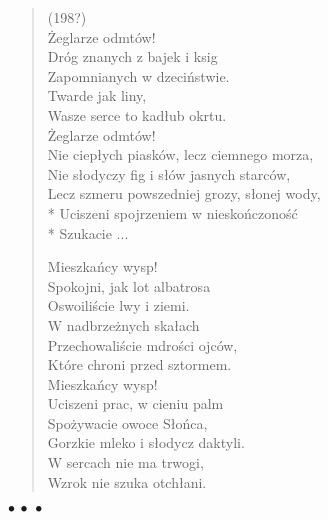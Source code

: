 \documentclass{article} %
\newenvironment{wierszd}[2]
	{\begin{verse} \hspace*{-1em}{\bf #1}\hfill{\small{(#2)}}\\[.5ex] }
	{\end{verse} \begin{center}$\bullet\ \bullet\ \bullet$\end{center}}
\newcommand{\e}{\eob}
\renewcommand{\a}{\aob}
\renewcommand{\o}{\'{o}}
\newcommand{\n}{\'{n}}
\newcommand{\s}{\'{s}}
\newcommand{\ci}{\'{c}}
\begin{document}

\begin{wierszd}{}{198?}

\.{Z}eglarze odm{\e}t{\o}w! \\ 
Dr{\o}g znanych z bajek i ksi{\a}g \\ 
Zapomnianych w dzeci{\n}stwie. \\ 
Twarde jak liny, \\ 
Wasze serce to kad{\l}ub okr{\e}tu. \\ 
\.{Z}eglarze odm{\e}t{\o}w! \\ 
Nie ciep{\l}ych piask{\o}w, lecz ciemnego morza, \\ 
Nie s{\l}odyczy fig i s{\l}{\o}w jasnych starc{\o}w, \\ 
Lecz szmeru powszedniej grozy, s{\l}onej wody, \\*
Uciszeni spojrzeniem w niesko{\n}czono{\s}{\ci} \\* 
Szukacie ... 
 
Mieszka{\n}cy wysp! \\ 
Spokojni, jak lot albatrosa \\ 
Oswoili{\s}cie lwy i ziemi{\e}. \\ 
W nadbrze\.{z}nych ska{\l}ach \\ 
Przechowali{\s}cie m{\a}dro{\s}ci ojc{\o}w, \\ 
Kt{\o}re chroni{\a} przed sztormem. \\ 
Mieszka{\n}cy wysp! \\ 
Uciszeni prac{\a}, w cieniu palm \\ 
Spo\.{z}ywacie owoce S{\l}o{\n}ca, \\ 
Gorzkie mleko i s{\l}odycz daktyli. \\ 
W sercach nie ma trwogi, \\ 
Wzrok nie szuka otch{\l}ani.

\end{wierszd}
\vspace*{-4ex}
\end{document}

